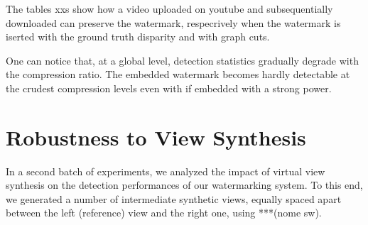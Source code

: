  The tables xxs show how a video uploaded on youtube and subsequentially downloaded can preserve the watermark, respecrively when the watermark is iserted with the ground truth disparity and with graph cuts.\newline
 
 \begin{table}[htbp]
  \label{Tab:ytgt}
  \begin{center}
  \caption{}
  \end{center}
  \end{table}
 
\begin{table}[htbp]
 \label{Tab:ytkz}
 \begin{center}
 \caption{}
 \end{center}
 \end{table}


One can notice that, at a global level, detection  statistics gradually degrade with the compression ratio. The embedded watermark becomes hardly detectable at the crudest compression levels even with if embedded with a strong power. 
 
\section{Robustness to View Synthesis}

In a second batch of experiments, we analyzed the impact of virtual view synthesis on the detection performances
of our watermarking system. To this end, we generated a number of intermediate synthetic views, equally spaced
apart between the left (reference) view and the right one, using ***(nome sw).\newline

